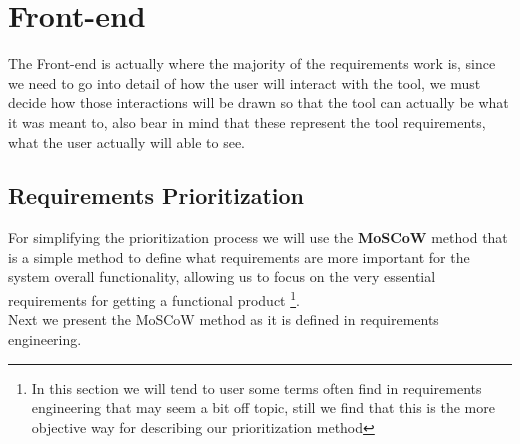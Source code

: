 
\section{Front-end}
\label{sec:frontend}

The Front-end is actually where the majority of the requirements work is, since we need to go into detail of how the user will interact with the tool, we must decide how those interactions will be drawn so that the tool can actually be what it was meant to, also bear in mind that these represent the tool requirements, what the user actually will able to see.

\subsection{Requirements Prioritization}
For simplifying the prioritization process we will use the \textbf{MoSCoW} method \citep{clegg1994case} that is a simple method to define what requirements are more important for the system overall functionality, allowing us to focus on the very essential requirements for getting a functional product \footnote{In this section we will tend to user some terms often find in requirements engineering that may seem a bit off topic, still we find that this is the more objective way for describing our prioritization method}.\\
\indent Next we present the MoSCoW method as it is defined in requirements engineering.

